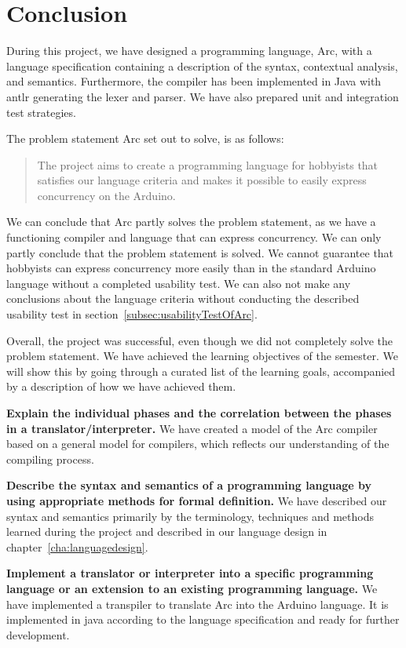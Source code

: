 \chapter{Conclusion}\label{cha:conclusion}

During this project, we have designed a programming language, Arc, with a language specification containing a description of the syntax, contextual analysis, and semantics. Furthermore, the compiler has been implemented in Java with \gls{antlr} generating the lexer and parser. We have also prepared unit and integration test strategies.

The problem statement Arc set out to solve, is as follows: 

\blockquote{The project aims to create a programming language for hobbyists that satisfies our language criteria and makes it possible to easily express concurrency on the Arduino.}

We can conclude that Arc partly solves the problem statement, as we have a functioning compiler and language that can express concurrency. We can only partly conclude that the problem statement is solved. We cannot guarantee that hobbyists can express concurrency more easily than in the standard Arduino language without a completed usability test. We can also not make any conclusions about the language criteria without conducting the described usability test in section~\ref{subsec:usabilityTestOfArc}.

Overall, the project was successful, even though we did not completely solve the problem statement. We have achieved the learning objectives of the semester. We will show this by going through a curated list of the learning goals, accompanied by a description of how we have achieved them.

\textbf{Explain the individual phases and the correlation between the phases in a translator/interpreter.} We have created a model of the Arc compiler based on a general model for compilers, which reflects our understanding of the compiling process.

\textbf{Describe the syntax and semantics of a programming language by using appropriate methods for formal definition.} We have described our syntax and semantics primarily by the terminology, techniques and methods learned during the project and described in our language design in chapter~\ref{cha:languagedesign}.

\textbf{Implement a translator or interpreter into a specific programming language or an extension to an existing programming language.} We have implemented a transpiler to translate Arc into the Arduino language. It is implemented in java according to the language specification and ready for further development.

